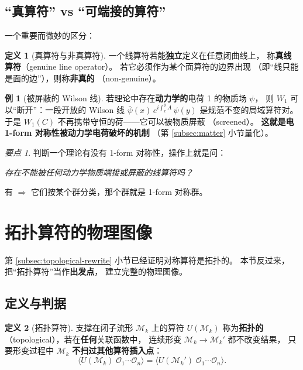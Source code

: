 \documentclass[UTF8,a4paper,11pt]{ctexart}
\theoremstyle{plain}
\theoremstyle{definition}
\newtheorem{definition}{定义}[section]
\newtheorem{example}{例}[section]
\theoremstyle{remark}
\newtheorem{keypoint}{要点}[section]
\newcommand{\Op}{\mathcal{O}}
\newcommand{\Mfd}{\mathcal{M}}
\newcommand{\en}[1]{\textsf{#1}}       %
\newcommand{\Uop}{U}
\begin{document}
\subsection{“真算符” vs “可端接的算符”}
\label{subsec:genuine}

一个重要而微妙的区分：

\begin{definition}[真算符与非真算符]
一个线算符若能\textbf{独立}定义在任意闭曲线上，
称\textbf{真线算符}（\en{genuine line operator}）。
若它必须作为某个面算符的边界出现
（即“线只能是面的边”），则称\textbf{非真的}
（\en{non-genuine}）。
\end{definition}

\begin{example}[被屏蔽的 Wilson 线]
\label{ex:screening}
若理论中存在\textbf{动力学的}电荷 1 的物质场 $\psi$，
则 $W_1$ 可以“断开”：一段开放的 Wilson 线
$\bar\psi(x)\,e^{i\int_x^y A}\,\psi(y)$ 是规范不变的局域算符对。
于是 $W_1(C)$ 不再携带守恒的荷——它可以被物质屏蔽
（\en{screened}）。
\textbf{这就是电 1-form 对称性被动力学电荷破坏的机制}
（第 \ref{subsec:matter} 小节量化）。
\end{example}

\begin{keypoint}
\label{kp:genuine}
判断一个理论有没有 1-form 对称性，操作上就是问：
\begin{center}
\emph{存在不能被任何动力学物质端接或屏蔽的线算符吗？}
\end{center}
有 $\Rightarrow$ 它们按某个群分类，那个群就是 1-form 对称群。
\end{keypoint}

\section{拓扑算符的物理图像}
\label{sec:topological}

第 \ref{subsec:topological-rewrite} 小节已经证明对称算符是拓扑的。
本节反过来，把“拓扑算符”当作\textbf{出发点}，
建立完整的物理图像。

\subsection{定义与判据}

\begin{definition}[拓扑算符]
\label{def:topological}
支撑在闭子流形 $\Mfd_k$ 上的算符 $\Uop(\Mfd_k)$ 称为\textbf{拓扑的}
（\en{topological}），若在\textbf{任何}关联函数中，
连续形变 $\Mfd_k\to\Mfd_k'$ 都不改变结果，
只要形变过程中 $\Mfd_k$ \textbf{不扫过其他算符插入点}：
\begin{equation}
  \big\langle \Uop(\Mfd_k)\;\Op_1\cdots\Op_n\big\rangle
  =\big\langle \Uop(\Mfd_k')\;\Op_1\cdots\Op_n\big\rangle .
  \label{eq:topodef}
\end{equation}
\end{definition}
\end{document}
